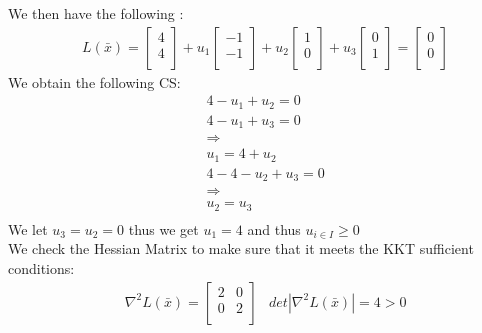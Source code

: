 \documentclass[12pt]{article}
\begin{document}
    We then have the following : \\ 
        \begin{align*}
            &L(\bar x) = \begin{bmatrix}
                4\\
                4\\
            \end{bmatrix} + 
            u_1 
            \begin{bmatrix}
                -1\\
                -1\\
            \end{bmatrix} + 
            u_2 
            \begin{bmatrix}
                1\\
                0\\
            \end{bmatrix} + 
            u_3 
            \begin{bmatrix} 
                0\\
                1\\
            \end{bmatrix} = 
            \begin{bmatrix}
                0\\
                0\\
            \end{bmatrix}
        \end{align*}
    We obtain the following CS: \\ 
        \begin{align*}
            &4 - u_1 + u_2 = 0 \\
            &4 - u_1 + u_3 = 0 \\ 
            &\Rightarrow\\
            &u_1 = 4 + u_2\\
            &4 - 4 - u_2 + u_3 = 0\\
            &\Rightarrow\\
            &u_2 = u_3\\
        \end{align*}
    We let $u_3 = u_2 = 0$ thus we get $u_1 = 4$ and thus $u_{i \in I} \geq 0$\\ 
    We check the Hessian Matrix to make sure that it meets the KKT sufficient conditions:\\
        \begin{align*}
            &\nabla^2 L(\bar x) = 
                \begin{bmatrix}
                    2 & 0 \\
                    0 & 2 \\
                \end{bmatrix}
            &det|\nabla^2 L(\bar x) | = 4 > 0\\
        \end{align*}
\end{document}
